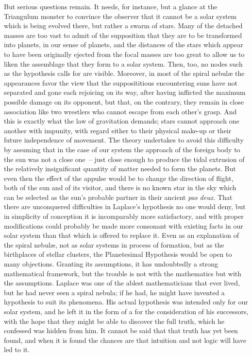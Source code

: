 But serious questions remain. It needs, for instance, but a glance at
the Triangulum monster to convince the observer that it cannot be a
solar system which is being evolved there, but rather a swarm of
stars. Many of the detached masses are too vast to admit of the
supposition that they are to be transformed into planets, in our sense
of planets, and the distances of the stars which appear to have been
originally ejected from the focal masses are too great to allow us to
liken the assemblage that they form to a solar system. Then, too, no
nodes such as the hypothesis calls for are visible. Moreover, in most
of the spiral nebul{\ae} the appearances favor the view that the
supposititious encountering suns have not separated and gone each
rejoicing on its way, after having inflicted the maximum possible
damage on its opponent, but that, on the contrary, they remain in
close association like two wrestlers who cannot escape from each
other's grasp. And this is exactly what the law of gravitation
demands; stars cannot approach one another with impunity, with regard
either to their physical make-up or their future independence of
movement. The theory undertakes to avoid this difficulty by assuming
that in the case of our system the approach of the foreign body to the
sun was not a close one~-- just close enough to produce the tidal
extrusion of the relatively insignificant quantity of matter needed to
form the planets. But even then the effect of the appulse would be to
change the direction of flight, both of the sun and of its visitor,
and there is no known star in the sky which can be selected as the
sun's probable partner in their ancient {\em pas deux.} That there are
unconquered difficulties in Laplace's hypothesis no one would deny,
but in simplicity of conception it is incomparably more satisfactory,
and with proper modifications could probably be made more consonant
with existing facts in our solar system than that which is offered to
replace it. Even as an explanation of the spiral nebul{\ae}, not as
solar systems in process of formation, but as the birthplaces of
stellar clusters, the Planetesimal Hypothesis would be open to many
objections. Granting its assumptions, it has undoubtedly a strong
mathematical framework, but the trouble is not with the mathematics
but with the assumptions. Laplace was one of the ablest mathematicians
that ever lived, but he had never seen a spiral nebula; if he had, he
might have invented a hypothesis to suit its phenomena. His actual
hypothesis was intended only for our solar system, and he left it in
the form of a  for the consideration of his successors,
with the hope that they might be able to discover the full truth,
which he confessed was hidden from him. It cannot be said that that
truth has yet been found, and when it is found the chances are that
intuition and not logic will have led to it.

